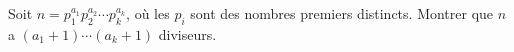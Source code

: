 Soit $n = p_1^{a_1}p_2^{a_2}\cdots p_k^{a_k}$, où les $p_i$ sont des nombres premiers distincts. Montrer que $n$ a $(a_1 + 1)\cdots(a_k + 1)$ diviseurs.
